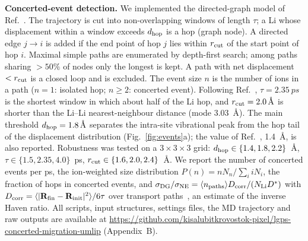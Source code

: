 \documentclass[11pt,a4paper]{article}
\begin{document}
\textbf{Concerted-event detection.} We implemented the directed-graph model of Ref.~\cite{Sato2026}. The trajectory is cut into non-overlapping windows of length $\tau$; a Li whose displacement within a window exceeds $d_{\rm hop}$ is a hop (graph node). A directed edge $j\to i$ is added if the end point of hop $j$ lies within $r_{\rm cut}$ of the start point of hop $i$. Maximal simple paths are enumerated by depth-first search; among paths sharing $>50\%$ of nodes only the longest is kept. A path with net displacement $<r_{\rm cut}$ is a closed loop and is excluded. The event size $n$ is the number of ions in a path ($n=1$: isolated hop; $n\ge2$: concerted event). Following Ref.~\cite{Sato2026}, $\tau=\SI{2.35}{ps}$ is the shortest window in which about half of the Li hop, and $r_{\rm cut}=\SI{2.0}{\angstrom}$ is shorter than the Li--Li nearest-neighbour distance (mode \SI{3.03}{\angstrom}). The main threshold $d_{\rm hop}=\SI{1.8}{\angstrom}$ separates the intra-site vibrational peak from the hop tail of the displacement distribution (Fig.~\ref{fig:events}a); the value of Ref.~\cite{Sato2026}, \SI{1.4}{\angstrom}, is also reported. Robustness was tested on a $3\times3\times3$ grid: $d_{\rm hop}\in\{1.4,1.8,2.2\}$~\AA, $\tau\in\{1.5,2.35,4.0\}$~ps, $r_{\rm cut}\in\{1.6,2.0,2.4\}$~\AA. We report the number of concerted events per ps, the ion-weighted size distribution $P(n)=nN_n/\sum_i iN_i$, the fraction of hops in concerted events, and $\sigma_{\rm DG}/\sigma_{\rm NE}=\langle n_{\rm paths}\rangle D_{\rm corr}/(N_{\rm Li}D^*)$ with $D_{\rm corr}=\langle|\mathbf R_{\rm fin}-\mathbf R_{\rm init}|^2\rangle/6\tau$ over transport paths~\cite{Sato2026}, an estimate of the inverse Haven ratio. All scripts, input structures, settings files, the MD trajectory and raw outputs are available at \url{https://github.com/kisalubitkrovostok-pixel/lgps-concerted-migration-umlip} (Appendix~B).
\end{document}
